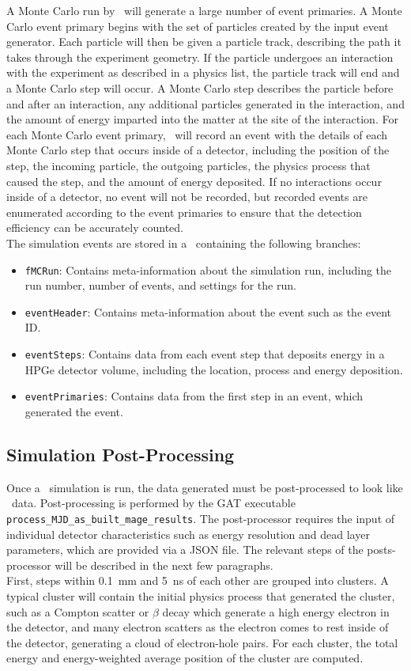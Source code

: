 \documentclass[/main.tex]{subfiles}
\begin{document}
A Monte Carlo run by \geant\ will generate a large number of event primaries.
A Monte Carlo event primary begins with the set of particles created by the input event generator.
Each particle will then be given a particle track, describing the path it takes through the experiment geometry.
If the particle undergoes an interaction with the experiment as described in a physics list, the particle track will end and a Monte Carlo step will occur.
A Monte Carlo step describes the particle before and after an interaction, any additional particles generated in the interaction, and the amount of energy imparted into the matter at the site of the interaction.
For each Monte Carlo event primary, \Mage\ will record an event with the details of each Monte Carlo step that occurs inside of a detector, including the position of the step, the incoming particle, the outgoing particles, the physics process that caused the step, and the amount of energy deposited.
If no interactions occur inside of a detector, no event will not be recorded, but recorded events are enumerated according to the event primaries to ensure that the detection efficiency can be accurately counted.
\\
The simulation events are stored in a \TTree\ containing the following branches:
\begin{itemize}
\item{\texttt{fMCRun}:}
  Contains meta-information about the simulation run, including the run number, number of events, and settings for the run.
\item{\texttt{eventHeader}:}
  Contains meta-information about the event such as the event ID.
\item{\texttt{eventSteps}:}
  Contains data from each event step that deposits energy in a HPGe detector volume, including the location, process and energy deposition.
\item{\texttt{eventPrimaries}:}
  Contains data from the first step in an event, which generated the event.
\end{itemize}

\subsection{Simulation Post-Processing} \label{sec:simpostproc}
Once a \Mage\ simulation is run, the data generated must be post-processed to look like \MJD\ data.
Post-processing is performed by the GAT executable \texttt{process\_MJD\_as\_built\_mage\_results}.
The post-processor requires the input of individual detector characteristics such as energy resolution and dead layer parameters, which are provided via a JSON file.
The relevant steps of the posts-processor will be described in the next few paragraphs.
\\
First, steps within 0.1~mm and 5~ns of each other are grouped into clusters.
A typical cluster will contain the initial physics process that generated the cluster, such as a Compton scatter or $\beta$ decay which generate a high energy electron in the detector, and many electron scatters as the electron comes to rest inside of the detector, generating a cloud of electron-hole pairs.
For each cluster, the total energy and energy-weighted average position of the cluster are computed.
\\
\end{document}
